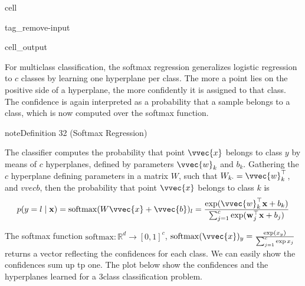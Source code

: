 \documentclass[letterpaper,10pt,english]{jupyterBook}
\begin{document}
\begin{sphinxuseclass}{cell}
\begin{sphinxuseclass}{tag_remove-input}\begin{sphinxVerbatimOutput}

\begin{sphinxuseclass}{cell_output}
\noindent{}

\end{sphinxuseclass}\end{sphinxVerbatimOutput}

\end{sphinxuseclass}
\end{sphinxuseclass}
\sphinxAtStartPar
For multiclass classification, the softmax regression generalizes logistic regression to \(c\) classes by learning one hyperplane per class. The more a point lies on the positive side of a hyperplane, the more confidently it is assigned to that class. The confidence is again interpreted as a probability that a sample belongs to a class, which is now computed over the softmax function.
\label{neuralnets_intro:definition-0}
\begin{sphinxadmonition}{note}{Definition 32 (Softmax Regression)}



\sphinxAtStartPar
The  classifier computes the probability that point \(\vvec{x}\) belongs to class \(y\) by means of \(c\) hyperplanes, defined by parameters \(\vvec{w}_k\) and \(b_k\). Gathering the \(c\) hyperplane defining parameters in a matrix \(W\), such that \(W_{k\cdot} = \vvec{w}_k^\top\), and \(vvec{b}\), then the probability that point \(\vvec{x}\) belongs to class \(k\) is
\begin{equation*}
\begin{split}
p(y = l \mid \mathbf{x}) =\mathrm{softmax}(W\vvec{x}+\vvec{b})_l= \frac{\exp(\vvec{w}_k^\top \mathbf{x} + b_k)}{\sum_{j=1}^{c} \exp(\mathbf{w}_j^\top \mathbf{x} + b_j)}
\end{split}
\end{equation*}
\end{sphinxadmonition}

\sphinxAtStartPar
The softmax function \(\mathrm{softmax}:\mathbb{R}^d\rightarrow [0,1]^c\), \(\mathrm{softmax}(\vvec{x})_y=\frac{\exp(x_y)}{\sum_{j=1}^c\exp{x_j}}\) returns a vector reflecting the confidences for each class. We can easily show the confidences sum up tp one. The plot below show the confidences and the hyperplanes learned for a 3\sphinxhyphen{}class classification problem.
\end{document}
